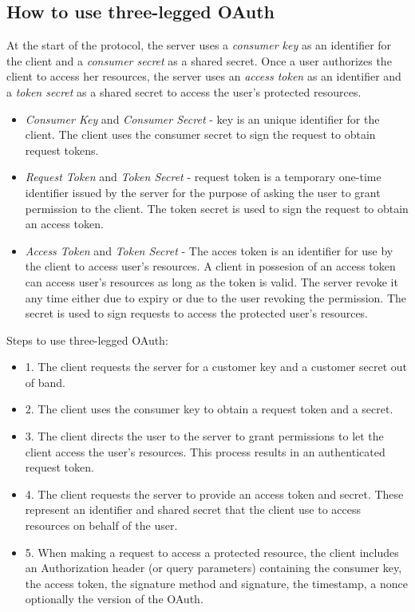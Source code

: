 \documentclass[11pt,a4paper]{article}
\begin{document}
\subsection{How to use three-legged OAuth}
At the start of the protocol, the server uses a \textit{consumer key} as an identifier for the client and a \textit{consumer secret} as a shared secret. Once a user authorizes the client to access her resources, the server uses an \textit{access token} as an identifier and a \textit{token secret} as a shared secret to access the user's protected resources.
\begin{itemize}
	\item \textit{Consumer Key} and \textit{Consumer Secret} - key is an unique identifier for the client. The client uses the consumer secret to sign the request to obtain request tokens.
	\item \textit{Request Token} and \textit{Token Secret} - request token is a temporary one-time identifier issued by the server for the purpose of asking the user to grant permission to the client. The token secret is used to sign the request to obtain an access token.
	\item \textit{Access Token} and \textit{Token Secret} - The acces token is an identifier for use by the client to access user's resources. A client in possesion of an access token can access user's resources as long as the token is valid. The server revoke it any time either due to expiry or due to the user revoking the permission. The secret is used to sign requests to access the protected user's resources.
\end{itemize}

Steps to use three-legged OAuth:
\begin{itemize}
	\item 1. The client requests the server for a customer key and a customer secret out of band.
	\item 2. The client uses the consumer key to obtain a request token and a secret.
	\item 3. The client directs the user to the server to grant permissions to let the client access the user's resources. This process results in an authenticated request token.
	\item 4. The client requests the server to provide an access token and secret. These represent an identifier and shared secret that the client use to access resources on behalf of the user.
	\item 5. When making a request to access a protected resource, the client includes an Authorization header (or query parameters) containing the consumer key, the access token, the signature method and signature, the timestamp, a nonce optionally the version of the OAuth.
\end{itemize}
\end{document}

